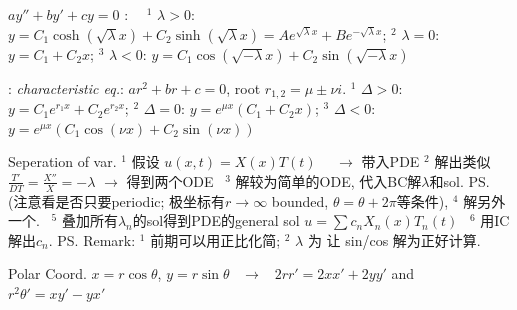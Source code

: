 \documentclass{note}
\begin{document}
\vspace{-2pt}
\begin{MyTh}{$ay''+by'+cy=0$}
    : \ \ $^1$ $\lambda>0$: $y=C_1\cosh(\sqrt{\lambda}x)+C_2\sinh(\sqrt{\lambda}x)= A e^{\sqrt{\lambda}x}+B e^{-\sqrt{\lambda}x}$; \quad $^2$ $\lambda=0$: $y=C_1+C_2 x$; \quad $^3$ $\lambda<0$: $y=C_1\cos(\sqrt{-\lambda}x)+C_2\sin(\sqrt{-\lambda}x)$

    \quad {}: \textit{characteristic eq.}: $a r^2 + b r + c = 0$, root $r_{1,2}=\mu\pm\nu i$. \quad $^1$ $\Delta>0$: $y=C_1 e^{r_1 x}+C_2 e^{r_2 x}$; \quad $^2$ $\Delta=0$: $y=e^{\mu x}(C_1+C_2 x)$; \quad $^3$ $\Delta<0$: $y=e^{\mu x}(C_1\cos(\nu x)+C_2\sin(\nu x))$
\end{MyTh}

\vspace{-2pt}
\begin{MyTh}{Seperation of var.}
    $^1$ 假设 $u(x,t)=X(x)T(t)$ \ \ $\to$ 带入PDE $^2$ 解出类似 $\frac{T'}{DT}=\frac{X''}{X}=-\lambda$ $\to$ 得到两个ODE \ $^3$ 解较为简单的ODE, 代入BC解$\lambda$和sol. \ps{\tiny (注意看是否只要periodic; 极坐标有$r\to\infty$ bounded, $\theta=\theta+2\pi$等条件)}, $^4$ 解另外一个. \ $^5$ 叠加所有$\lambda_n$的sol得到PDE的general sol $u=\sum c_nX_n(x)T_n(t)$ \ $^6$ 用IC解出$c_n$. \qquad \ps{\tiny Remark: $^1$ 前期可以用正比化简; $^2$ $\lambda$ 为 让 sin/cos 解为正好计算.}
\end{MyTh}

\begin{MyTh}{Polar Coord.}
    $x=r\cos\theta$, $y=r\sin\theta$ \ $\to$ \ $2rr'=2xx'+2yy'$ and $r^2\theta'=xy'-yx'$  
\end{MyTh}
\end{document}
